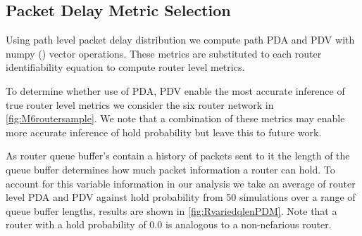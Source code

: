   \subsection{Packet Delay Metric Selection}
  \label{ssec:MPDMseclection}
  Using path level packet delay distribution we compute path PDA and PDV with numpy (\cite{harris_array_2020}) vector operations. These metrics are substituted to each router identifiability equation to compute router level metrics.\par
  To determine whether use of PDA, PDV enable the most accurate inference of true router level metrics we consider the six router network in \cref{fig:M6routersample}. We note that a combination of these metrics may enable more accurate inference of hold probability but leave this to future work.\par
  As router queue buffer's contain a history of packets sent to it the length of the queue buffer determines how much packet information a router can hold. To account for this variable information in our analysis we take an average of router level PDA and PDV against hold probability from 50 simulations over a range of queue buffer lengths, results are shown in \cref{fig:RvariedqlenPDM}. Note that a router with a hold probability of 0.0 is analogous to a non-nefarious router.\par
